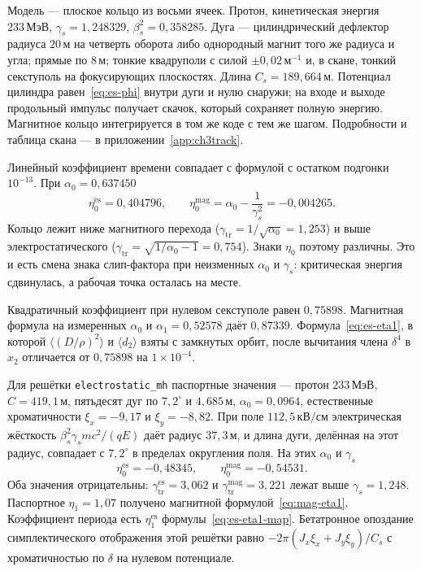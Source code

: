 \documentclass[aps,pra,preprint,a4paper,amsmath,amssymb,longbibliography]{revtex4-2}
\begin{document}
Модель --- плоское кольцо из восьми ячеек. Протон, кинетическая энергия $233\,\text{МэВ}$, $\gamma_s=1{,}248329$, $\beta_s^2=0{,}358285$. Дуга --- цилиндрический дефлектор радиуса $20\,\text{м}$ на четверть оборота либо однородный магнит того же радиуса и угла; прямые по $8\,\text{м}$; тонкие квадруполи с силой $\pm 0{,}02\,\text{м}^{-1}$ и, в скане, тонкий секступоль на фокусирующих плоскостях. Длина $C_s=189{,}664\,\text{м}$. Потенциал цилиндра равен~\eqref{eq:es-phi} внутри дуги и нулю снаружи; на входе и выходе продольный импульс получает скачок, который сохраняет полную энергию. Магнитное кольцо интегрируется в том же коде с тем же шагом. Подробности и таблица скана --- в приложении~\ref{app:ch3track}.

Линейный коэффициент времени совпадает с формулой с остатком подгонки $10^{-13}$. При $\alpha_0=0{,}637450$
\begin{equation}
\label{eq:es-num-eta0}
\eta_0^{\mathrm{es}}=0{,}404796,
\qquad
\eta_0^{\mathrm{mag}}=\alpha_0-\frac{1}{\gamma_s^2}=-0{,}004265.
\end{equation}
Кольцо лежит ниже магнитного перехода ($\gamma_{\mathrm{tr}}=1/\sqrt{\alpha_0}=1{,}253$) и выше электростатического ($\gamma_{\mathrm{tr}}=\sqrt{1/\alpha_0-1}=0{,}754$). Знаки $\eta_0$ поэтому различны. Это и есть смена знака слип-фактора при неизменных $\alpha_0$ и $\gamma_s$: критическая энергия сдвинулась, а рабочая точка осталась на месте.

Квадратичный коэффициент при нулевом секступоле равен $0{,}75898$. Магнитная формула на измеренных $\alpha_0$ и $\alpha_1=0{,}52578$ даёт $0{,}87339$. Формула~\eqref{eq:es-eta1}, в которой $\langle(D/\rho)^2\rangle$ и $\langle d_2\rangle$ взяты с замкнутых орбит, после вычитания члена $\delta^4$ в $x_2$ отличается от $0{,}75898$ на $1\times 10^{-4}$.

Для решётки \texttt{electrostatic\_mh} паспортные значения --- протон $233\,\text{МэВ}$, $C=419{,}1\,\text{м}$, пятьдесят дуг по $7{,}2^\circ$ и $4{,}685\,\text{м}$, $\alpha_0=0{,}0964$, естественные хроматичности $\xi_x=-9{,}17$ и $\xi_y=-8{,}82$. При поле $112{,}5\,\text{кВ/см}$ электрическая жёсткость $\beta_s^2\gamma_s mc^2/(qE)$ даёт радиус $37{,}3\,\text{м}$, и длина дуги, делённая на этот радиус, совпадает с $7{,}2^\circ$ в пределах округления поля. На этих $\alpha_0$ и $\gamma_s$
\begin{equation}
\label{eq:es-mh}
\eta_0^{\mathrm{es}}=-0{,}48345,
\qquad
\eta_0^{\mathrm{mag}}=-0{,}54531.
\end{equation}
Оба значения отрицательны: $\gamma_{\mathrm{tr}}^{\mathrm{es}}=3{,}062$ и $\gamma_{\mathrm{tr}}^{\mathrm{mag}}=3{,}221$ лежат выше $\gamma_s=1{,}248$. Паспортное $\eta_1=1{,}07$ получено магнитной формулой~\eqref{eq:mag-eta1}. Коэффициент периода есть $\eta_1^{\mathrm{es}}$ формулы~\eqref{eq:es-eta1-map}. Бетатронное опоздание симплектического отображения этой решётки равно $-2\pi(J_x\xi_x+J_y\xi_y)/C_s$ с хроматичностью по $\delta$ на нулевом потенциале.
\end{document}
